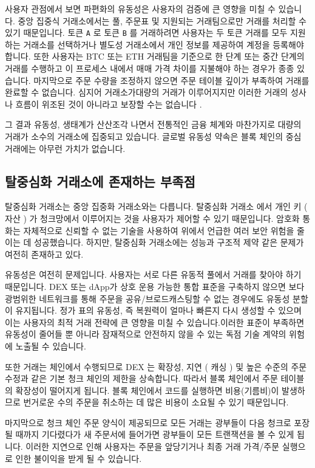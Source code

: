 \documentclass{article}
\begin{document}
\begin{multicols}{2}
\indent 사용자 관점에서 보면 파편화의 유동성은 사용자의 검증에 큰 영향을 미칠 수 있습니다. 중앙 집중식 거래소에서는 풀, 주문표 및 지원되는 거래팀으로만 거래를 처리할 수 있기 때문입니다. 토큰 \verb|A| 로 토큰 \verb|B| 를 거래하려면 사용자는 두 토큰 거래를 모두 지원하는 거래소를 선택하거나 별도성 거래소에서 개인 정보를 제공하여 계정을 등록해야 합니다. 또한 사용자는 BTC 또는 ETH 거래팀을 기준으로 한 단계 또는 중간 단계의 거래를 수행하고 이 프로세스 내에서 매매 가격 차이를 지불해야 하는 경우가 종종 있습니다. 마지막으로 주문 수량을 조정하지 않으면 주문 테이블 깊이가 부족하여 거래를 완료할 수 없습니다. 심지어 거래소가대량의 거래가 이루어지지만 이러한 거래의 성사나 흐름이 위조된 것이 아니라고 보장할 수는 없습니다 .\cite{fakevolume}

\indent 그 결과 유동성, 생태계가 산산조각 나면서 전통적인 금융 체계와 마찬가지로 대량의 거래가 소수의 거래소에 집중되고 있습니다. 글로벌 유동성 약속은 블록 체인의 중심 거래에는 아무런 가치가 없습니다.

\subsection{탈중심화 거래소에 존재하는 부족점}
\indent 탈중심화 거래소는 중앙 집중화 거래소와는 다릅니다. 탈중심화 거래소 에서 개인 키 ( 자산 ) 가 청크망에서 이루어지는 것을 사용자가 제어할 수 있기 때문입니다. 암호화 통화는 자체적으로 신뢰할 수 없는 기술을 사용하여 위에서 언급한 여러 보안 위험을 줄이는 데 성공했습니다. 하지만, 탈중심화 거래소에는 성능과 구조적 제약 같은 문제가 여전히 존재하고 있다.

\indent 유동성은 여전히 문제입니다. 사용자는 서로 다른 유동적 풀에서 거래를 찾아야 하기 때문입니다. DEX 또는 dApp가 상호 운용 가능한 통합 표준을 구축하지 않으면 보다 광범위한 네트워크를 통해 주문을 공유/브로드캐스팅할 수 없는 경우에도 유동성 분할이 유지됩니다. 정가 표의 유동성, 즉 복원력이 얼마나 빠른지 다시 생성할 수 있으며 이는 사용자의 최적 거래 전략에 큰 영향을 미칠 수 있습니다\cite{limitorderliquidity}.이러한 표준이 부족하면 유동성이 줄어들 뿐 아니라 잠재적으로 안전하지 않을 수 있는 독점 기술 계약의 위험에 노출될 수 있습니다.

\indent 또한 거래는 체인에서 수행되므로 DEX 는 확장성, 지연 ( 캐싱 ) 및 높은 수준의 주문 수정과 같은 기본 청크 체인의 제한을 상속합니다. 따라서 블록 체인에서 주문 테이블의 확장성이 떨어지게 됩니다. 블록 체인에서 코드를 실행하면 비용(기름비)이 발생하므로 번거로운 수의 주문을 취소하는 데 많은 비용이 소요될 수 있기 때문입니다.

\indent 마지막으로 청크 체인 주문 양식이 제공되므로 모든 거래는 광부들이 다음 청크로 포장될 때까지 기다렸다가 새 주문서에 들어가면 광부들이 모든 트랜잭션을 볼 수 있게 됩니다. 이러한 지연으로 인해 사용자는 주문을 앞당기거나 최종 거래 가격/주문 실행으로 인한 불이익을 받게 될 수 있습니다.


\end{multicols}
\end{document}

